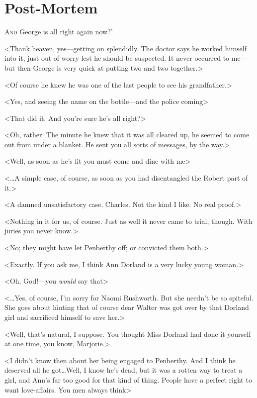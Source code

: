 \chapter{Post-Mortem}

\lettrine[ante=‘]{A}{nd} George is all right again now?'

\zz
<Thank heaven, yes—getting on splendidly. The doctor says he worked himself into it, just out of worry lest he should be suspected. It never occurred to me—but then George is very quick at putting two and two together.>

<Of course he knew he was one of the last people to see his grandfather.>

<Yes, and seeing the name on the bottle—and the police coming\longdash>

<That did it. And you're sure he's all right?>

<Oh, rather. The minute he knew that it was all cleared up, he seemed to come out from under a blanket. He sent you all sorts of messages, by the way.>

<Well, as soon as he's fit you must come and dine with me\longdots>

<\dots A simple case, of course, as soon as you had disentangled the Robert part of it.>

<A damned unsatisfactory case, Charles. Not the kind I like. No real proof.>

<Nothing in it for us, of course. Just as well it never came to trial, though. With juries you never know.>

<No; they might have let Penberthy off; or convicted them both.>

<Exactly. If you ask me, I think Ann Dorland is a very lucky young woman.>

<Oh, God!—you \emph{would} say that\longdots>

<\dots Yes, of course, I'm sorry for Naomi Rushworth. But she needn't be so spiteful. She goes about hinting that of course dear Walter was got over by that Dorland girl and sacrificed himself to save her.>

<Well, that's natural, I suppose. You thought Miss Dorland had done it yourself at one time, you know, Marjorie.>

<I didn't know then about her being engaged to Penberthy. And I think he deserved all he got\dots Well, I know he's dead, but it was a rotten way to treat a girl, and Ann's far too good for that kind of thing. People have a perfect right to want love-affairs. You men always think\longdots>

